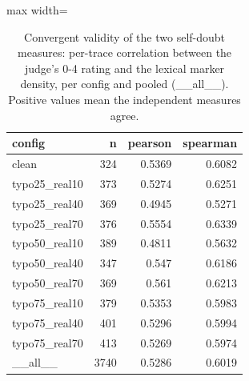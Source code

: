 \documentclass[11pt]{article}
\begin{document}
\begin{table}[H]
\centering
\caption{Convergent validity of the two self-doubt measures: per-trace correlation between the judge's 0-4 rating and the lexical marker density, per config and pooled (\_\_all\_\_). Positive values mean the independent measures agree.}
\small
\begin{adjustbox}{max width=\textwidth}
\begin{tabular}{lrrr}
\toprule
\textbf{config} & \textbf{n} & \textbf{pearson} & \textbf{spearman} \\
\midrule
clean & 324 & 0.5369 & 0.6082 \\
typo25\_real10 & 373 & 0.5274 & 0.6251 \\
typo25\_real40 & 369 & 0.4945 & 0.5271 \\
typo25\_real70 & 376 & 0.5554 & 0.6339 \\
typo50\_real10 & 389 & 0.4811 & 0.5632 \\
typo50\_real40 & 347 & 0.547 & 0.6186 \\
typo50\_real70 & 369 & 0.561 & 0.6213 \\
typo75\_real10 & 379 & 0.5353 & 0.5983 \\
typo75\_real40 & 401 & 0.5296 & 0.5994 \\
typo75\_real70 & 413 & 0.5269 & 0.5974 \\
\_\_all\_\_ & 3740 & 0.5286 & 0.6019 \\
\bottomrule
\end{tabular}
\end{adjustbox}
\end{table}
\end{document}
